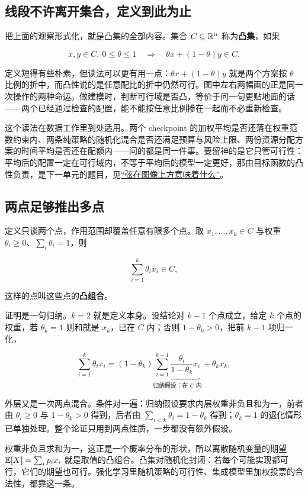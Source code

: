 \subsection{线段不许离开集合，定义到此为止}

把上面的观察形式化，就是凸集的全部内容。集合 \(C\subseteq\mathbb{R}^n\) 称为\textbf{凸集}，如果

\[
x,y\in C,\ 0\le\theta\le1
\quad\Longrightarrow\quad
\theta x+(1-\theta)y\in C.
\]

定义短得有些朴素，但读法可以更有用一点：\(\theta x+(1-\theta)y\) 就是两个方案按 \(\theta\) 比例的折中，而凸性说的是任意配比的折中仍然可行。图中左右两幅画的正是同一次操作的两种命运。做建模时，判断可行域是否凸，等价于问一句更贴地面的话——两个已经通过检查的配置，能不能按任意比例掺在一起而不必重新检查。

这个读法在数据工作里到处适用。两个 checkpoint 的加权平均是否还落在权重范数约束内、两条纯策略的随机化混合是否还满足预算与风险上限、两份资源分配方案的时间平均是否还在配额内——问的都是同一件事。要留神的是它只管可行性：平均后的配置一定在可行域内，不等于平均后的模型一定更好，那由目标函数的凸性负责，是下一单元的题目，见\hyperref[sec:09-Convex-Optimization/03-Convex-Functions/01]{``弦在图像上方意味着什么''}。

\subsection{两点足够推出多点}

定义只谈两个点，作用范围却覆盖任意有限多个点。取 \(x_1,\dots,x_k\in C\) 与权重 \(\theta_i\ge0\)、\(\sum_i\theta_i=1\)，则

\[
\sum_{i=1}^k\theta_i x_i\in C,
\]

这样的点叫这些点的\textbf{凸组合}。

证明是一句归纳。\(k=2\) 就是定义本身。设结论对 \(k-1\) 个点成立，给定 \(k\) 个点的权重，若 \(\theta_k=1\) 则和就是 \(x_k\)，已在 \(C\) 内；否则 \(1-\theta_k>0\)，把前 \(k-1\) 项归一化，

\[
\sum_{i=1}^k\theta_i x_i
=(1-\theta_k)\underbrace{\sum_{i=1}^{k-1}\frac{\theta_i}{1-\theta_k}x_i}_{\text{归纳假设：在 }C\text{ 内}}+\theta_k x_k,
\]

外层又是一次两点混合。条件对一遍：归纳假设要求内层权重非负且和为一，前者由 \(\theta_i\ge0\) 与 \(1-\theta_k>0\) 得到，后者由 \(\sum_{i<k}\theta_i=1-\theta_k\) 得到；\(\theta_k=1\) 的退化情形已单独处理。整个论证只用到两点性质，一步都没有额外假设。

权重非负且求和为一，这正是一个概率分布的形状，所以离散随机变量的期望 \(\mathbb{E}[X]=\sum_i p_i x_i\) 就是取值的凸组合。凸集对随机化封闭：若每个可能实现都可行，它们的期望也可行。强化学习里随机策略的可行性、集成模型里加权投票的合法性，都靠这一条。


